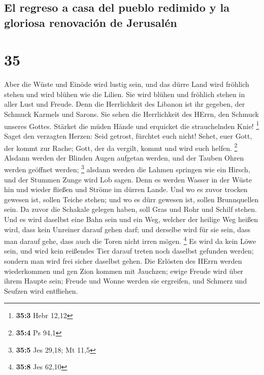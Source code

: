 \hypertarget{el-regreso-a-casa-del-pueblo-redimido-y-la-gloriosa-renovaciuxf3n-de-jerusaluxe9n}{%
\subsection{El regreso a casa del pueblo redimido y la gloriosa
renovación de
Jerusalén}\label{el-regreso-a-casa-del-pueblo-redimido-y-la-gloriosa-renovaciuxf3n-de-jerusaluxe9n}}

\hypertarget{section-34}{%
\section{35}\label{section-34}}

 Aber die Wüste und Einöde wird lustig sein, und das dürre
Land wird fröhlich stehen und wird blühen wie die Lilien. 
Sie wird blühen und fröhlich stehen in aller Lust und Freude. Denn die
Herrlichkeit des Libanon ist ihr gegeben, der Schmuck Karmels und
Sarons. Sie sehen die Herrlichkeit des HErrn, den Schmuck unseres
Gottes.  Stärket die müden Hände und erquicket die
strauchelnden Knie! \footnote{\textbf{35:3} Hebr 12,12} 
Saget den verzagten Herzen: Seid getrost, fürchtet euch nicht! Sehet,
euer Gott, der kommt zur Rache; Gott, der da vergilt, kommt und wird
euch helfen. \footnote{\textbf{35:4} Ps 94,1}  Alsdann
werden der Blinden Augen aufgetan werden, und der Tauben Ohren werden
geöffnet werden; \footnote{\textbf{35:5} Jes 29,18; Mt 11,5}
 alsdann werden die Lahmen springen wie ein Hirsch, und
der Stummen Zunge wird Lob sagen. Denn es werden Wasser in der Wüste hin
und wieder fließen und Ströme im dürren Lande.  Und wo es
zuvor trocken gewesen ist, sollen Teiche stehen; und wo es dürr gewesen
ist, sollen Brunnquellen sein. Da zuvor die Schakale gelegen haben, soll
Gras und Rohr und Schilf stehen.  Und es wird daselbst
eine Bahn sein und ein Weg, welcher der heilige Weg heißen wird, dass
kein Unreiner darauf gehen darf; und derselbe wird für sie sein, dass
man darauf gehe, dass auch die Toren nicht irren mögen. \footnote{\textbf{35:8}
  Jes 62,10}  Es wird da kein Löwe sein, und wird kein
reißendes Tier darauf treten noch daselbst gefunden werden; sondern man
wird frei sicher daselbst gehen.  Die Erlösten des HErrn
werden wiederkommen und gen Zion kommen mit Jauchzen; ewige Freude wird
über ihrem Haupte sein; Freude und Wonne werden sie ergreifen, und
Schmerz und Seufzen wird entfliehen.

